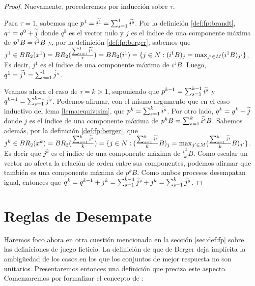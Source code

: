 \begin{proof}
    Nuevamente, procederemos por inducción sobre $\tau$.

    Para $\tau = 1$, sabemos que $p^1 = \widetilde{i^1} = \sum_{s=1}^1{\widetilde{i^s}}$. Por la definición \ref{def:fp:brandt}, $q^1 = q^0 + \widetilde{j}$ donde $q^0$ es el vector nulo y $j$ es el índice de una componente máxima de $p^{1}B = \widetilde{i^1}B$ y, por la definición \ref{def:fp:berger}, sabemos que $j^1 \in BR_2(x^1) = BR_2(\frac{\sum^1_{s=1} \widetilde{i^s}}{\tau}) = BR_2(i^1) = \{j \in N : (i^{1}B)_j = \max_{j' \in M} (i^{1}B)_{j'}\}$. Es decir, $j^1$ es el índice de una componente máxima de $i^{1}B$. Luego, $q^1 = \widetilde{j^1} = \sum_{s=1}^1{\widetilde{j^s}}$.

    Veamos ahora el caso de $\tau = k > 1$, suponiendo que $p^{k-1} = \sum_{s=1}^{k-1}{\widetilde{i^s}}$ y $q^{k-1} = \sum_{s=1}^{k-1}{\widetilde{j^s}}$. Podemos afirmar, con el mismo argumento que en el caso inductivo del lema \ref{lema:equiv:sim}, que $p^{k} = \sum_{s=1}^k{\widetilde{i^s}}$. Por otro lado, $q^{k} = y^{k} + \widetilde{j}$ donde $j$ es el índice de una componente máxima de $p^{k}B = \sum_{s=1}^k{\widetilde{i^s}}B$. Sabemos además, por la definición \ref{def:fp:berger}, que $j^k \in BR_2(x^{k}) = BR_2(\frac{\sum_{s=1}^{k}{\widetilde{i^s}}}{k}) = \{j \in N : (\frac{\sum_{s=1}^{k}{\widetilde{i^s}}}{k}B)_j = \max_{j' \in M} (\frac{\sum_{s=1}^{k}{\widetilde{i^s}}}{k}B)_{j'}\}$. Es decir que $j^k$ es el índice de una componente máxima de $\frac{p^k}{k}B$. Como escalar un vector no afecta la relación de orden entre sus componentes, podemos afirmar que también es una componente máxima de $p^{k}B$. Como ambos procesos desempatan igual, entonces que $q^k = q^{k-1} + j^k = \sum_{s=1}^{k-1}{\widetilde{j^s}} + j^k = \sum_{s=1}^{k}{\widetilde{j^s}}$.

\end{proof}

\section{Reglas de Desempate}

Haremos foco ahora en otra cuestión mencionada en la sección \ref{sec:def:fp} sobre las definiciones de juego ficticio. La definición de que de Berger deja implícita la ambigüedad de los casos en los que los conjuntos de mejor respuesta no son unitarios. Presentaremos entonces una definición que preciza este aspecto. Comenzaremos por formalizar el concepto de :

